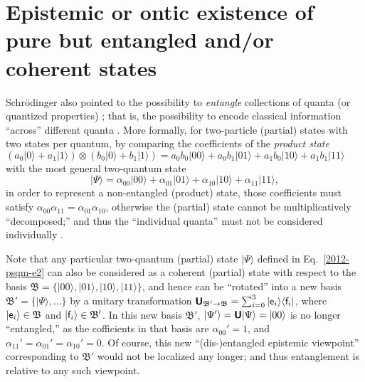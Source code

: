 \documentclass[%
  preprint,
 showpacs,
 showkeys,
 preprintnumbers,
 amsmath,amssymb,
 aps,
   pra,
  longbibliography,
 ]{revtex4-1}
\begin{document}
\section{Epistemic or ontic existence of pure but entangled and/or coherent states}

Schr\"odinger
\cite{schrodinger} also pointed to the possibility to {\em entangle} collections of quanta (or quantized properties) \cite{schroedinger-interpretation}; that is, the possibility
to encode classical information ``across'' different quanta \cite{zeil-99}.
More formally, for two-particle (partial) states with two states per quantum, by comparing the coefficients of
the {\em product state}
$
\left(
a_0 \vert 0 \rangle + a_1 \vert 1 \rangle
\right)
\otimes
\left(
b_0 \vert 0 \rangle + b_1 \vert 1 \rangle
\right)
=
a_0b_0 \vert 00 \rangle + a_0b_1 \vert 01 \rangle
+
a_1b_0 \vert 10 \rangle + a_1b_1 \vert 11 \rangle
$
with the most general
two-quantum state
\begin{equation}
\vert \Psi\rangle =
\alpha_{00} \vert 00 \rangle + \alpha_{01}  \vert 01 \rangle
+
\alpha_{10}  \vert 10 \rangle + \alpha_{11}  \vert 11 \rangle
,
\label{2012-psqm-e2}
\end{equation}
in order to represent  a non-entangled (product) state,
those coefficients must satisfy
$
\alpha_{00}\alpha_{11} = \alpha_{01} \alpha_{10}
$,
otherwise the (partial) state  cannot be multiplicatively ``decomposed;''
and thus the ``individual quanta'' must not be considered individually
\cite[pp.~17-18]{mermin-07}.

Note that any particular two-quantum (partial) state $\vert \Psi\rangle$ defined in Eq.~\ref{2012-psqm-e2}
can also be considered as a coherent (partial) state with respect to the basis
${\mathfrak B}=\{
\vert 00 \rangle, \vert 01 \rangle , \vert 10 \rangle ,  \vert 11 \rangle
\}$,
and hence can be ``rotated'' into a new basis  ${\mathfrak B}'=\{\vert \Psi\rangle ,\ldots
\}$  by a unitary transformation \cite{Schwinger.60}
$
\textsf{\textbf{U}}_{{\mathfrak B}' \rightarrow {\mathfrak B}}
=
\sum_{i=0}^3
\vert {\textsf e}_i\rangle
\langle {\textsf f}_i \vert
$,
where
$\vert {\textsf e}_i\rangle \in {\mathfrak B}$ and
$\vert {\textsf f}_i\rangle \in {\mathfrak B}'$.
In this new basis ${\mathfrak B}'$, $\vert \Psi '\rangle = \textsf{\textbf{U}}\vert \Psi\rangle = \vert 00 \rangle$ is no longer ``entangled,''
as the cofficients in that basis are $\alpha_{00}'=1$, and $\alpha_{11}' = \alpha_{01}' = \alpha_{10}' = 0$.
Of course, this new ``(dis-)entangled epistemic viewpoint''
corresponding to  ${\mathfrak B}'$ \cite{PhysRevLett.87.077901,PhysRevLett.92.060402,Torre-2010,DallaChiara-epistemic,Caponigro-epis-ontic}
would not be localized any longer; and thus entanglement is relative to any such viewpoint.
\end{document}
